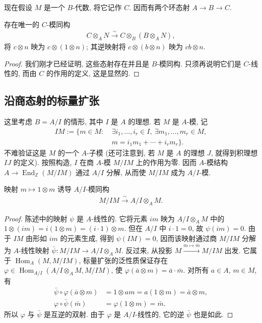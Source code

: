 现在假设 $M$ 是一个 $B$-代数, 将它记作 $C$. 因而有两个环态射 $A\longrightarrow B\longrightarrow C$.
\begin{proposition*}
存在唯一的 $C$-模同构
\begin{align*}
C\otimes_A N\xrightarrow{\sim}C\otimes_B(B\otimes_A N),
\end{align*}
将 $c\otimes n$ 映为 $c\otimes(1\otimes n)$; 其逆映射将 $c\otimes(b\otimes n)$ 映为 $cb\otimes n$.
\end{proposition*}
\begin{proof}
我们刚才已经证明, 这些态射存在并且是 $B$-模同构. 只须再说明它们是 $C$-线性的, 而由 $C$ 的作用的定义, 这是显然的.
\end{proof}

\subsection{沿商态射的标量扩张}\label{sec:galois-1-8-8}
这里考虑 $B=A/I$ 的情形, 其中 $I$ 是 $A$ 的理想. 若 $M$ 是 $A$-模, 记
\begin{align*}
IM:=\{m\in M:\ &\exists i_1,\ldots,i_r\in I,\ \exists m_1,\ldots,m_r\in M,\\
&m=i_1m_1+\cdots+i_rm_r\}.
\end{align*}
不难验证这是 $M$ 的一个 $A$-子模 (还可注意到, 若 $M$ 是 $A$ 的理想 $J$, 就得到积理想 $IJ$ 的定义). 按照构造, $I$ 在商 $A$-模 $M/IM$ 上的作用为零. 因而 $A$-模结构 $A\longrightarrow\operatorname{End}_{\mathbb Z}(M/IM)$ 通过 $A/I$ 分解, 从而使 $M/IM$ 成为 $A/I$-模.
\begin{proposition*}
映射 $m\mapsto1\otimes m$ 诱导 $A/I$-模同构
\begin{align*}
M/IM\xrightarrow{\sim}A/I\otimes_A M.
\end{align*}
\end{proposition*}
\begin{proof}
陈述中的映射 $\psi$ 是 $A$-线性的. 它将元素 $im$ 映为 $A/I\otimes_A M$ 中的 $1\otimes(im)=i(1\otimes m)=(i\cdot1)\otimes m$. 但在 $A/I$ 中 $i\cdot1=0$, 故 $\psi(im)=0$. 由于 $IM$ 由形如 $im$ 的元素生成, 得到 $\psi(IM)=0$, 因而该映射通过商 $M/IM$ 分解为 $A$-线性映射 $\bar\psi:M/IM\longrightarrow A/I\otimes_A M$. 反过来, 从投影 $M\xrightarrow{m\mapsto\bar m}M/IM$ 出发. 它属于 $\operatorname{Hom}_A(M,M/IM)$, 标量扩张的泛性质保证存在 $\varphi\in\operatorname{Hom}_{A/I}(A/I\otimes_A M,M/IM)$, 使 $\varphi(\bar a\otimes m)=\bar a\cdot\bar m$. 对所有 $a\in A$, $m\in M$, 有
\begin{align*}
\bar\psi\circ\varphi(\bar a\otimes m)&=1\otimes am=a(1\otimes m)=\bar a\otimes m,\\
\varphi\circ\bar\psi(\bar m)&=\varphi(1\otimes m)=\bar m.
\end{align*}
所以 $\varphi$ 与 $\bar\psi$ 是互逆的双射. 由于 $\varphi$ 是 $A/I$-线性的, 它的逆 $\bar\psi$ 也是如此.
\end{proof}
